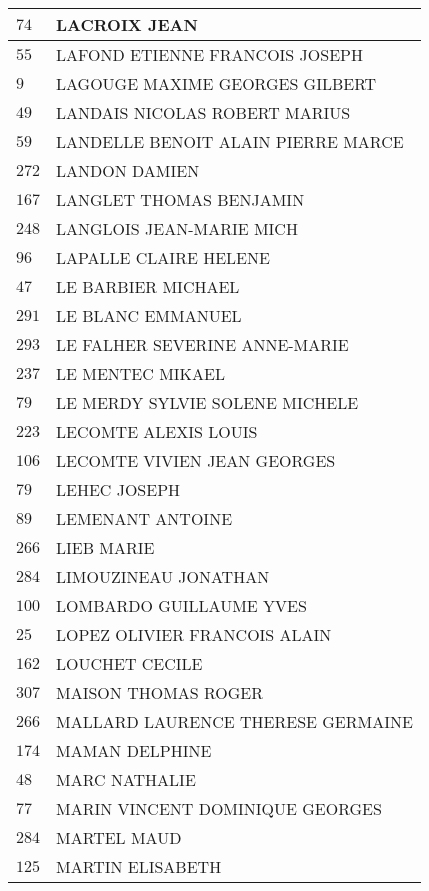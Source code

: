 \begin{xltabular}{\linewidth}{|l|X|}
    \hline
    $74$ & LACROIX JEAN \\
    \hline
    $55$ & LAFOND ETIENNE FRANCOIS JOSEPH \\
    \hline
    $9$ & LAGOUGE MAXIME GEORGES GILBERT \\
    \hline
    $49$ & LANDAIS NICOLAS ROBERT MARIUS \\
    \hline
    $59$ & LANDELLE BENOIT ALAIN PIERRE MARCE \\
    \hline
    $272$ & LANDON DAMIEN \\
    \hline
    $167$ & LANGLET THOMAS BENJAMIN \\
    \hline
    $248$ & LANGLOIS JEAN-MARIE MICH \\
    \hline
    $96$ & LAPALLE CLAIRE HELENE \\
    \hline
    $47$ & LE BARBIER MICHAEL \\
    \hline
    $291$ & LE BLANC EMMANUEL \\
    \hline
    $293$ & LE FALHER SEVERINE ANNE-MARIE \\
    \hline
    $237$ & LE MENTEC MIKAEL \\
    \hline
    $79$ & LE MERDY SYLVIE SOLENE MICHELE \\
    \hline
    $223$ & LECOMTE ALEXIS LOUIS \\
    \hline
    $106$ & LECOMTE VIVIEN JEAN GEORGES \\
    \hline
    $79$ & LEHEC JOSEPH \\
    \hline
    $89$ & LEMENANT ANTOINE \\
    \hline
    $266$ & LIEB MARIE \\
    \hline
    $284$ & LIMOUZINEAU JONATHAN \\
    \hline
    $100$ & LOMBARDO GUILLAUME YVES \\
    \hline
    $25$ & LOPEZ OLIVIER FRANCOIS ALAIN \\
    \hline
    $162$ & LOUCHET CECILE \\
    \hline
    $307$ & MAISON THOMAS ROGER \\
    \hline
    $266$ & MALLARD LAURENCE THERESE GERMAINE \\
    \hline
    $174$ & MAMAN DELPHINE \\
    \hline
    $48$ & MARC NATHALIE \\
    \hline
    $77$ & MARIN VINCENT DOMINIQUE GEORGES \\
    \hline
    $284$ & MARTEL MAUD \\
    \hline
    $125$ & MARTIN ELISABETH \\

\end{xltabular}
